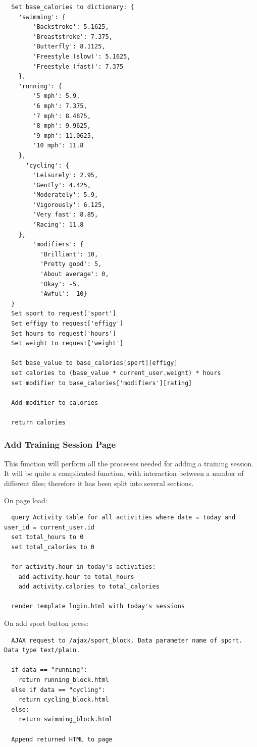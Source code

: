 \documentclass{article}[12pt,a4paper]
\begin{document}
\begin{verbatim}
  Set base_calories to dictionary: {
    'swimming': {
        'Backstroke': 5.1625, 
        'Breaststroke': 7.375, 
        'Butterfly': 8.1125, 
        'Freestyle (slow)': 5.1625,
        'Freestyle (fast)': 7.375
    },
    'running': {
        '5 mph': 5.9, 
        '6 mph': 7.375, 
        '7 mph': 8.4875, 
        '8 mph': 9.9625, 
        '9 mph': 11.0625, 
        '10 mph': 11.8
    },
      'cycling': {
        'Leisurely': 2.95, 
        'Gently': 4.425, 
        'Moderately': 5.9, 
        'Vigorously': 6.125, 
        'Very fast': 8.85,
        'Racing': 11.8
    },
        'modifiers': {
          'Brilliant': 10, 
          'Pretty good': 5, 
          'About average': 0, 
          'Okay': -5, 
          'Awful': -10}
  }
  Set sport to request['sport']
  Set effigy to request['effigy']
  Set hours to request['hours']
  Set weight to request['weight']

  Set base_value to base_calories[sport][effigy]
  set calories to (base_value * current_user.weight) * hours
  set modifier to base_calories['modifiers'][rating]

  Add modifier to calories

  return calories
\end{verbatim}

\subsubsection{Add Training Session Page}
This function will perform all the processes needed for adding a training session. It will be quite a complicated function, with interaction between a number of different files; therefore it has been split into several sections.


On page load:
\begin{verbatim}
  query Activity table for all activities where date = today and user_id = current_user.id
  set total_hours to 0
  set total_calories to 0

  for activity.hour in today's activities:
    add activity.hour to total_hours
    add activity.calories to total_calories

  render template login.html with today's sessions
\end{verbatim}

\noindent
On add sport button press:
\begin{verbatim}
  AJAX request to /ajax/sport_block. Data parameter name of sport. Data type text/plain.

  if data == "running":
    return running_block.html
  else if data == "cycling":
    return cycling_block.html
  else:
    return swimming_block.html

  Append returned HTML to page
\end{verbatim}
\end{document}
